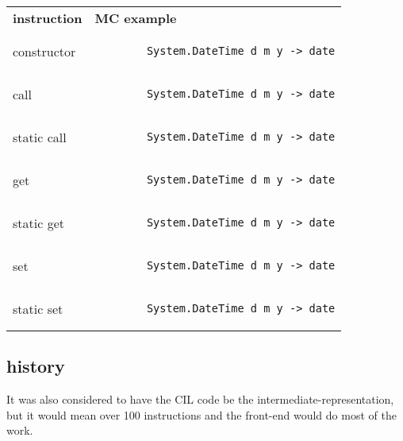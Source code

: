 \begin{tabular}{ll}
    \textbf{instruction} & \textbf{MC example}\\
    constructor & \begin{lstlisting}
        System.DateTime d m y -> date
    \end{lstlisting}\\
    call & \begin{lstlisting}
        System.DateTime d m y -> date
    \end{lstlisting}\\
    static call & \begin{lstlisting}
        System.DateTime d m y -> date
    \end{lstlisting}\\
    get & \begin{lstlisting}
        System.DateTime d m y -> date
    \end{lstlisting}\\
    static get & \begin{lstlisting}
        System.DateTime d m y -> date
    \end{lstlisting}\\
    set & \begin{lstlisting}
        System.DateTime d m y -> date
    \end{lstlisting}\\
    static set & \begin{lstlisting}
        System.DateTime d m y -> date
    \end{lstlisting}\\
\end{tabular}

\subsection{history}
It was also considered to have the CIL code be the intermediate-representation, but it would mean over 100 instructions and the front-end would do most of the work.
